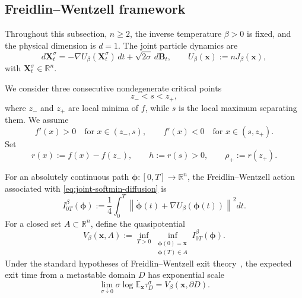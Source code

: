 \documentclass{article}
\theoremstyle{plain}
\theoremstyle{definition}
\theoremstyle{remark}
\begin{document}
\subsection{Freidlin--Wentzell framework}

Throughout this subsection, \(n\ge2\), the inverse temperature \(\beta>0\) is fixed, and the physical dimension is \(d=1\). The joint particle dynamics are
\begin{equation}
    d\mathbf X_t^\sigma
    =
    -\nabla U_\beta(\mathbf X_t^\sigma)\,dt
    +
    \sqrt{2\sigma}\,d\mathbf B_t,
    \qquad
    U_\beta(\mathbf x):=nJ_\beta(\mathbf x),
    \label{eq:joint-softmin-diffusion}
\end{equation}
with \(\mathbf X_t^\sigma\in\mathbb R^n\).

We consider three consecutive nondegenerate critical points
\[
    z_-<s<z_+,
\]
where \(z_-\) and \(z_+\) are local minima of \(f\), while \(s\) is the local maximum separating them. We assume
\begin{equation}
    f'(x)>0
    \quad\text{for }x\in(z_-,s),
    \qquad
    f'(x)<0
    \quad\text{for }x\in(s,z_+).
    \label{eq:adjacent-well-monotonicity}
\end{equation}
Set
\begin{equation}
    r(x):=f(x)-f(z_-),
    \qquad
    h:=r(s)>0,
    \qquad
    \rho_+:=r(z_+).
    \label{eq:relative-energy-coordinate}
\end{equation}

For an absolutely continuous path
\(\boldsymbol\phi:[0,T]\to\mathbb R^n\), the Freidlin--Wentzell action associated with \eqref{eq:joint-softmin-diffusion} is
\begin{equation}
    I_{0T}^\beta(\boldsymbol\phi)
    :=
    \frac14\int_0^T
    \left\|
        \dot{\boldsymbol\phi}(t)
        +
        \nabla U_\beta(\boldsymbol\phi(t))
    \right\|^2dt.
    \label{eq:fw-action}
\end{equation}
For a closed set \(A\subset\mathbb R^n\), define the quasipotential
\begin{equation}
    V_\beta(\mathbf x,A)
    :=
    \inf_{T>0}
    \inf_{\substack{
        \boldsymbol\phi(0)=\mathbf x\\
        \boldsymbol\phi(T)\in A
    }}
    I_{0T}^\beta(\boldsymbol\phi).
    \label{eq:fw-quasipotential}
\end{equation}
Under the standard hypotheses of Freidlin--Wentzell exit theory~\cite{freidlin2012random}, the expected exit time from a metastable domain \(D\) has exponential scale
\[
    \lim_{\sigma\downarrow0}
    \sigma\log\mathbb E_{\mathbf x}\tau_D^\sigma
    =
    V_\beta(\mathbf x,\partial D).
\]
\end{document}
